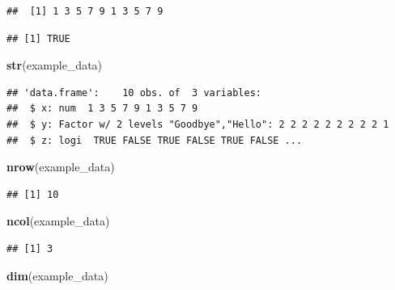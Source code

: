 \documentclass[]{book}
\newenvironment{Shaded}{\begin{snugshade}}{\end{snugshade}}
\newcommand{\KeywordTok}[1]{\textcolor[rgb]{0.13,0.29,0.53}{\textbf{#1}}}
\newcommand{\OperatorTok}[1]{\textcolor[rgb]{0.81,0.36,0.00}{\textbf{#1}}}
\newcommand{\NormalTok}[1]{#1}
\theoremstyle{definition}
\theoremstyle{definition}
\theoremstyle{definition}
\theoremstyle{remark}
\begin{document}
\begin{verbatim}
##  [1] 1 3 5 7 9 1 3 5 7 9
\end{verbatim}

\begin{Shaded}
\end{Shaded}

\begin{verbatim}
## [1] TRUE
\end{verbatim}

\begin{Shaded}
\begin{Highlighting}[]
\KeywordTok{str}\NormalTok{(example_data)}
\end{Highlighting}
\end{Shaded}

\begin{verbatim}
## 'data.frame':    10 obs. of  3 variables:
##  $ x: num  1 3 5 7 9 1 3 5 7 9
##  $ y: Factor w/ 2 levels "Goodbye","Hello": 2 2 2 2 2 2 2 2 2 1
##  $ z: logi  TRUE FALSE TRUE FALSE TRUE FALSE ...
\end{verbatim}

\begin{Shaded}
\begin{Highlighting}[]
\KeywordTok{nrow}\NormalTok{(example_data)}
\end{Highlighting}
\end{Shaded}

\begin{verbatim}
## [1] 10
\end{verbatim}

\begin{Shaded}
\begin{Highlighting}[]
\KeywordTok{ncol}\NormalTok{(example_data)}
\end{Highlighting}
\end{Shaded}

\begin{verbatim}
## [1] 3
\end{verbatim}

\begin{Shaded}
\begin{Highlighting}[]
\KeywordTok{dim}\NormalTok{(example_data)}
\end{Highlighting}
\end{Shaded}
\end{document}
